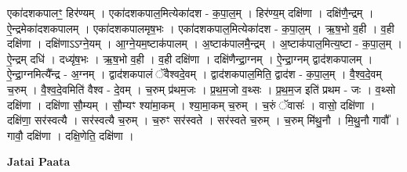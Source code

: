 \documentclass[17pt]{extarticle}
\begin{document}
एका॑दशकपालꣳ॒॒ हिर॑ण्यम् । एका॑दशकपाल॒मित्येका॑दश - क॒पा॒ल॒म् । हिर॑ण्य॒म् दक्षि॑णा । दक्षि॑णै॒न्द्रम् । ऐ॒न्द्रमेका॑दशकपालम् । एका॑दशकपालमृष॒भः । एका॑दशकपाल॒मित्येका॑दश - क॒पा॒ल॒म् । ऋ॒ष॒भो व॒ही । व॒ही दक्षि॑णा । दक्षि॑णाऽऽग्ने॒यम् । आ॒ग्ने॒यम॒ष्टाक॑पालम् । अ॒ष्टाक॑पालमै॒न्द्रम् । अ॒ष्टाक॑पाल॒मित्य॒ष्टा - क॒पा॒ल॒म् । ऐ॒न्द्रम् दधि॑ । दध्यृ॑ष॒भः । ऋ॒ष॒भो व॒ही । व॒ही दक्षि॑णा । दक्षि॑णैन्द्रा॒ग्नम् । ऐ॒न्द्रा॒ग्नम् द्वाद॑शकपालम् । ऐ॒न्द्रा॒ग्नमित्यै᳚न्द्र - अ॒ग्नम् । द्वाद॑शकपालं ॅवैश्वदे॒वम् । द्वाद॑शकपाल॒मिति॒ द्वाद॑श - क॒पा॒ल॒म् । वै॒श्व॒दे॒वम् च॒रुम् । वै॒श्व॒दे॒वमिति॑ वैश्व - दे॒वम् । च॒रुम् प्र॑थम॒जः । प्र॒थ॒म॒जो व॒थ्सः । प्र॒थ॒म॒ज इति॑ प्रथम - जः । व॒थ्सो दक्षि॑णा । 
दक्षि॑णा सौ॒म्यम् । सौ॒म्यꣳ श्या॑मा॒कम् । श्या॒मा॒कम् च॒रुम् । च॒रुं ॅवासः॑ । वासो॒ दक्षि॑णा । दक्षि॑णा॒ सर॑स्वत्यै । सर॑स्वत्यै च॒रुम् । च॒रुꣳ सर॑स्वते । सर॑स्वते च॒रुम् । 
च॒रुम् मि॑थु॒नौ । मि॒थु॒नौ गावौ᳚ । गावौ॒ दक्षि॑णा । 
दक्षि॒णेति॒ दक्षि॑णा । \newline

\textbf{Jatai Paata} \newline
\end{document}
